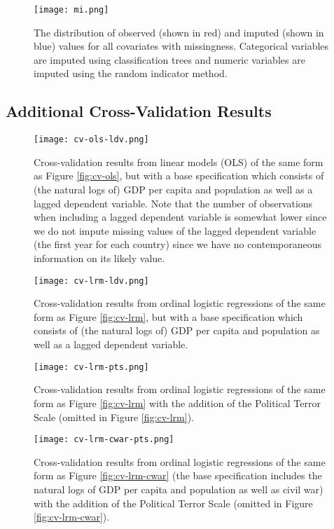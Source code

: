 \documentclass[11pt]{article}
\begin{document}
\begin{figure}[!htpb]
\centering
\texttt{[image: mi.png]}
\caption{The distribution of observed (shown in red) and imputed (shown in blue) values for all covariates with missingness. Categorical variables are imputed using classification trees and numeric variables are imputed using the random indicator method.}
\label{fig:mi}
\end{figure}

\clearpage

\subsection{Additional Cross-Validation Results}

\begin{figure}[!htpb]
\texttt{[image: cv-ols-ldv.png]}
\caption{Cross-validation results from linear models (OLS) of the same form as Figure \ref{fig:cv-ols}, but with a base specification which consists of (the natural logs of) GDP per capita and population as well as a lagged dependent variable. Note that the number of observations when including a lagged dependent variable is somewhat lower since we do not impute missing values of the lagged dependent variable (the first year for each country) since we have no contemporaneous information on its likely value.}
\label{fig:cv-ols-ldv}
\end{figure}

\begin{figure}[!htpb]
\texttt{[image: cv-lrm-ldv.png]}
\caption{Cross-validation results from ordinal logistic regressions of the same form as Figure \ref{fig:cv-lrm}, but with a base specification which consists of (the natural logs of) GDP per capita and population as well as a lagged dependent variable.}
\label{fig:cv-lrm-ldv}
\end{figure}

\begin{figure}[!htpb]
\texttt{[image: cv-lrm-pts.png]}
\caption{Cross-validation results from ordinal logistic regressions of the same form as Figure \ref{fig:cv-lrm} with the addition of the Political Terror Scale (omitted in Figure \ref{fig:cv-lrm}).}
\label{fig:cv-lrm-pts}
\end{figure}

\begin{figure}[!htpb]
\texttt{[image: cv-lrm-cwar-pts.png]}
\caption{Cross-validation results from ordinal logistic regressions of the same form as Figure \ref{fig:cv-lrm-cwar} (the base specification includes the natural logs of GDP per capita and population as well as civil war) with the addition of the Political Terror Scale (omitted in Figure \ref{fig:cv-lrm-cwar}).}
\label{fig:cv-lrm-cwar-pts}
\end{figure}
\end{document}
